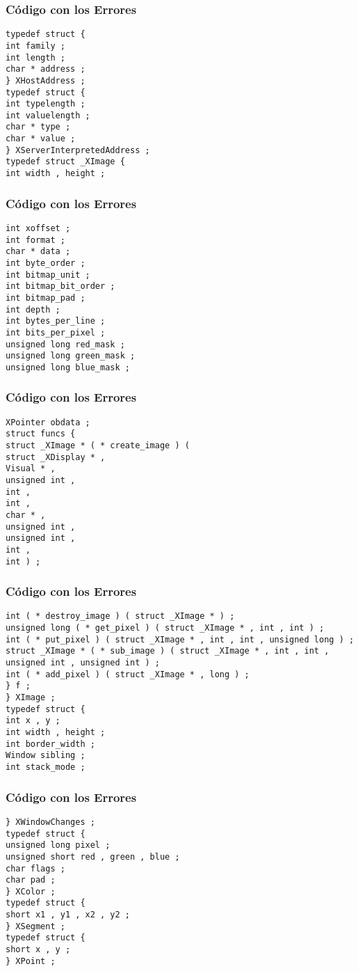 \documentclass{beamer}
\begin{document}
\begin{frame}[fragile]
\frametitle{C\'odigo con los Errores}
\begin{verbatim}
typedef struct { 
int family ; 
int length ; 
char * address ; 
} XHostAddress ; 
typedef struct { 
int typelength ; 
int valuelength ; 
char * type ; 
char * value ; 
} XServerInterpretedAddress ; 
typedef struct _XImage { 
int width , height ; 
\end{verbatim}
\end{frame}
\begin{frame}[fragile]
\frametitle{C\'odigo con los Errores}
\begin{verbatim}
int xoffset ; 
int format ; 
char * data ; 
int byte_order ; 
int bitmap_unit ; 
int bitmap_bit_order ; 
int bitmap_pad ; 
int depth ; 
int bytes_per_line ; 
int bits_per_pixel ; 
unsigned long red_mask ; 
unsigned long green_mask ; 
unsigned long blue_mask ; 
\end{verbatim}
\end{frame}
\begin{frame}[fragile]
\frametitle{C\'odigo con los Errores}
\begin{verbatim}
XPointer obdata ; 
struct funcs { 
struct _XImage * ( * create_image ) ( 
struct _XDisplay * , 
Visual * , 
unsigned int , 
int , 
int , 
char * , 
unsigned int , 
unsigned int , 
int , 
int ) ; 
\end{verbatim}
\end{frame}
\begin{frame}[fragile]
\frametitle{C\'odigo con los Errores}
\begin{verbatim}
int ( * destroy_image ) ( struct _XImage * ) ; 
unsigned long ( * get_pixel ) ( struct _XImage * , int , int ) ; 
int ( * put_pixel ) ( struct _XImage * , int , int , unsigned long ) ; 
struct _XImage * ( * sub_image ) ( struct _XImage * , int , int , unsigned int , unsigned int ) ; 
int ( * add_pixel ) ( struct _XImage * , long ) ; 
} f ; 
} XImage ; 
typedef struct { 
int x , y ; 
int width , height ; 
int border_width ; 
Window sibling ; 
int stack_mode ; 
\end{verbatim}
\end{frame}
\begin{frame}[fragile]
\frametitle{C\'odigo con los Errores}
\begin{verbatim}
} XWindowChanges ; 
typedef struct { 
unsigned long pixel ; 
unsigned short red , green , blue ; 
char flags ; 
char pad ; 
} XColor ; 
typedef struct { 
short x1 , y1 , x2 , y2 ; 
} XSegment ; 
typedef struct { 
short x , y ; 
} XPoint ; 
\end{verbatim}
\end{frame}
\end{document}
